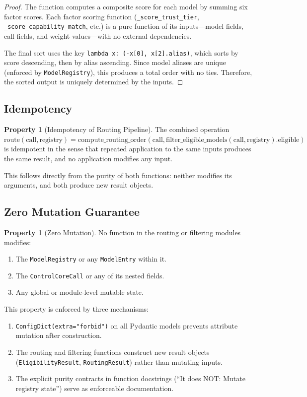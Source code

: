 \documentclass[11pt,a4paper]{article}
\theoremstyle{plain}
\theoremstyle{definition}
\newtheorem{property}[theorem]{Property}
\begin{document}
\begin{proof}
The function computes a composite score for each model by summing six factor
scores. Each factor scoring function (\texttt{\_score\_trust\_tier},
\texttt{\_score\_capability\_match}, etc.) is a pure function of its
inputs---model fields, call fields, and weight values---with no external
dependencies.

The final sort uses the key \texttt{lambda x: (-x[0], x[2].alias)}, which
sorts by score descending, then by alias ascending. Since model aliases are
unique (enforced by \texttt{ModelRegistry}), this produces a total order with
no ties. Therefore, the sorted output is uniquely determined by the inputs.
\end{proof}

\subsection{Idempotency}

\begin{property}[Idempotency of Routing Pipeline]
The combined operation $\text{route}(\text{call}, \text{registry}) =
\text{compute\_routing\_order}(\text{call},
\text{filter\_eligible\_models}(\text{call}, \text{registry}).\text{eligible})$
is idempotent in the sense that repeated application to the same inputs produces
the same result, and no application modifies any input.
\end{property}

This follows directly from the purity of both functions: neither modifies its
arguments, and both produce new result objects.

\subsection{Zero Mutation Guarantee}

\begin{property}[Zero Mutation]
No function in the routing or filtering modules modifies:
\begin{enumerate}
\item The \texttt{ModelRegistry} or any \texttt{ModelEntry} within it.
\item The \texttt{ControlCoreCall} or any of its nested fields.
\item Any global or module-level mutable state.
\end{enumerate}
\end{property}

This property is enforced by three mechanisms:
\begin{enumerate}
\item \texttt{ConfigDict(extra="forbid")} on all Pydantic models prevents
  attribute mutation after construction.
\item The routing and filtering functions construct new result objects
  (\texttt{EligibilityResult}, \texttt{RoutingResult}) rather than mutating
  inputs.
\item The explicit purity contracts in function docstrings (``It does NOT:
  Mutate registry state'') serve as enforceable documentation.
\end{enumerate}
\end{document}
